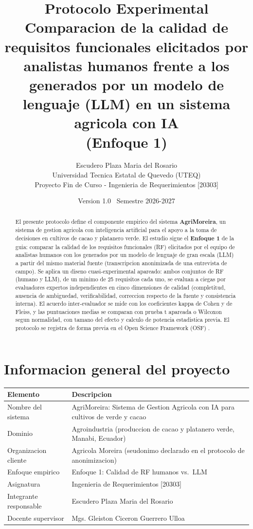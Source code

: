 \documentclass[12pt,a4paper]{article}
\title{\textbf{Protocolo Experimental}\\[0.5em]
\large Comparacion de la calidad de requisitos funcionales elicitados por
analistas humanos frente a los generados por un modelo de lenguaje (LLM) en un
sistema agricola con IA\\[0.5em]
\large (Enfoque 1)}
\author{Escudero Plaza Maria del Rosario\\[0.3em]
\small Universidad Tecnica Estatal de Quevedo (UTEQ)\\
\small Proyecto Fin de Curso - Ingenieria de Requerimientos [20303]}
\date{Version 1.0 \textbullet\ Semestre 2026-2027}
\begin{document}
\maketitle

\begin{abstract}
El presente protocolo define el componente empirico del sistema
\textbf{AgriMoreira}, un sistema de gestion agricola con inteligencia artificial
para el apoyo a la toma de decisiones en cultivos de cacao y platanero verde.
El estudio sigue el \textbf{Enfoque 1} de la guia: comparar la calidad de los
requisitos funcionales (RF) elicitados por el equipo de analistas humanos con
los generados por un modelo de lenguaje de gran escala (LLM) a partir del mismo
material fuente (transcripcion anonimizada de una entrevista de campo). Se
aplica un diseno cuasi-experimental apareado: ambos conjuntos de RF (humano y
LLM), de un minimo de 25 requisitos cada uno, se evaluan a ciegas por
evaluadores expertos independientes en cinco dimensiones de calidad
(completitud, ausencia de ambiguedad, verificabilidad, correccion respecto de
la fuente y consistencia interna). El acuerdo inter-evaluador se mide con los
coeficientes kappa de Cohen y de Fleiss, y las puntuaciones medias se comparan
con prueba t apareada o Wilcoxon segun normalidad, con tamano del efecto y
calculo de potencia estadistica previa. El protocolo se registra de forma
previa en el Open Science Framework (OSF) \cite{nosek2018}.
\end{abstract}

\tableofcontents
\newpage

\section{Informacion general del proyecto}

\begin{center}
\begin{tabular}{>{\raggedright\arraybackslash}p{5cm} p{9cm}}
\toprule
\textbf{Elemento} & \textbf{Descripcion} \\
\midrule
Nombre del sistema & AgriMoreira: Sistema de Gestion Agricola con IA para
cultivos de verde y cacao \\
Dominio & Agroindustria (produccion de cacao y platanero verde, Manabi,
Ecuador) \\
Organizacion cliente & Agricola Moreira (seudonimo declarado en el protocolo de
anonimizacion) \\
Enfoque empirico & Enfoque 1: Calidad de RF humanos vs.\ LLM \\
Asignatura & Ingenieria de Requerimientos [20303] \\
Integrante responsable & Escudero Plaza Maria del Rosario \\
Docente supervisor & Mgs. Gleiston Ciceron Guerrero Ulloa \\
\bottomrule
\end{tabular}
\end{center}
\end{document}
